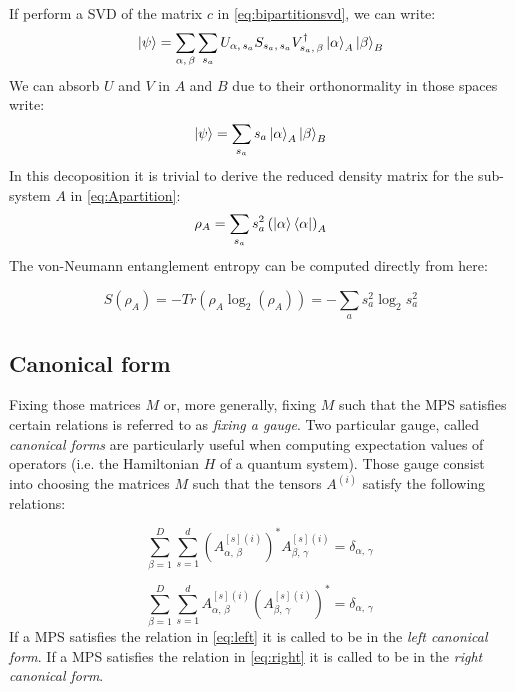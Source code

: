 \documentclass[11pt]{article}
\theoremstyle{definition}
\begin{document}
If perform a SVD of the matrix $c$ in \autoref{eq:bipartitionsvd}, we can write:
\begin{equation}
\ket \psi = \sum_{\alpha, \, \beta} \sum_{s_a} U_{\alpha, \, s_a} S_{s_a, \, s_a} V^\dagger_{s_a, \, \beta} \ket{\alpha}_A \ket{\beta}_B
\end{equation}
We can absorb $U$ and $V$ in $A$ and $B$ due to their orthonormality in those spaces write:
\begin{equation}
\ket \psi =  \sum_{s_a} s_a  \ket{\alpha}_A \ket{\beta}_B
\end{equation}
In this decoposition it is trivial to derive the reduced density matrix for the sub-system $A$ in \autoref{eq:Apartition}:
\begin{equation}\label{eq:canonical_rho_a}
\rho_A =  \sum_{s_a} s^2_a  \left( \ket{\alpha} \bra{\alpha}\right)_A
\end{equation}
The von-Neumann entanglement entropy can be computed directly from here:

\begin{equation}\label{eq:derived_entropy}
S(\rho_A)=-Tr(\rho_A\log_2(\rho_A))= -\sum_a s^2_a\log_2 s^2_a
\end{equation}

\subsection{Canonical form}

Fixing those matrices $M$ or, more generally, fixing $M$ such that the MPS satisfies certain relations is referred to as \textit{fixing a gauge}. 
Two particular gauge, called \textit{canonical forms} are particularly useful when computing expectation values of operators (i.e. the Hamiltonian $H$ of a quantum system). Those gauge consist into choosing the matrices $M$ such that the tensors $A^{(i)}$ satisfy the following relations:

\begin{equation}\label{eq:left}
\sum_{\beta=1}^D\sum_{s=1}^d \left(A^{[s](i)}_{\alpha, \, \beta}\right)^* A^{[s](i)}_{\beta, \, \gamma}= \delta_{\alpha, \, \gamma}  \, \end{equation}

\begin{equation}\label{eq:right}
\sum_{\beta=1}^D\sum_{s=1}^d A^{[s](i)}_{\alpha, \, \beta} \left(A^{[s](i)}_{\beta, \, \gamma}\right)^* = \delta_{\alpha, \, \gamma} \, 
\end{equation}
If a MPS satisfies the relation in \autoref{eq:left} it is called to be in the \textit{left canonical form}. If a MPS satisfies the relation in \autoref{eq:right} it is called to be in the \textit{right canonical form}.
\end{document}
